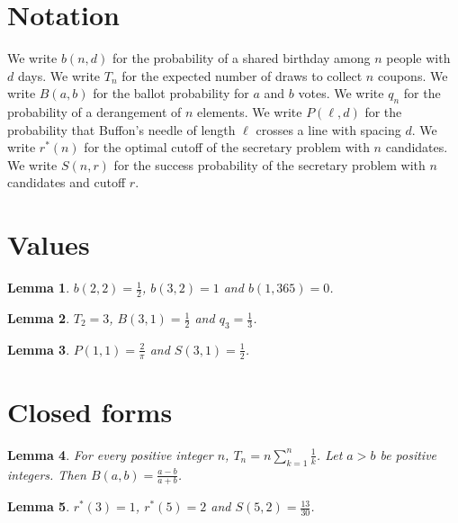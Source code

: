 \documentclass{article}
\newtheorem{lemma}{Lemma}
\begin{document}
\section{Notation}

We write $b(n,d)$ for the probability of a shared birthday among $n$ people with $d$ days.
We write $T_n$ for the expected number of draws to collect $n$ coupons.
We write $B(a,b)$ for the ballot probability for $a$ and $b$ votes.
We write $q_n$ for the probability of a derangement of $n$ elements.
We write $P(\ell,d)$ for the probability that Buffon's needle of length $\ell$ crosses a line with spacing $d$.
We write $r^*(n)$ for the optimal cutoff of the secretary problem with $n$ candidates.
We write $S(n,r)$ for the success probability of the secretary problem with $n$ candidates and cutoff $r$.

\section{Values}

\begin{lemma}\label{birthday}
$b(2,2)=\frac12$, $b(3,2)=1$ and $b(1,365)=0$.
\end{lemma}

\begin{lemma}\label{coupons}
$T_2=3$, $B(3,1)=\frac12$ and $q_3=\frac13$.
\end{lemma}

\begin{lemma}\label{buffon}
$P(1,1)=\frac{2}{\pi}$ and $S(3,1)=\frac12$.
\end{lemma}

\section{Closed forms}

\begin{lemma}\label{closed}
For every positive integer $n$, $T_n=n\sum_{k=1}^{n}\frac1k$. Let $a>b$ be positive integers. Then $B(a,b)=\frac{a-b}{a+b}$.
\end{lemma}

\begin{lemma}\label{secretary}
$r^*(3)=1$, $r^*(5)=2$ and $S(5,2)=\frac{13}{30}$.
\end{lemma}
\end{document}
